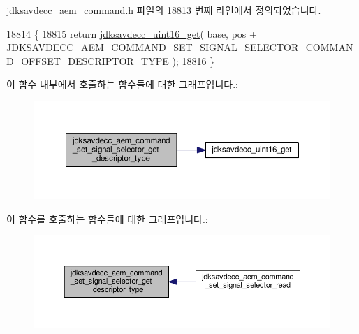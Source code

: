 jdksavdecc\+\_\+aem\+\_\+command.\+h 파일의 18813 번째 라인에서 정의되었습니다.


\begin{DoxyCode}
18814 \{
18815     \textcolor{keywordflow}{return} \hyperlink{group__endian_ga3fbbbc20be954aa61e039872965b0dc9}{jdksavdecc\_uint16\_get}( base, pos + 
      \hyperlink{group__command__set__signal__selector_gaf1c358d17635f50747fe271c5f12a9fe}{JDKSAVDECC\_AEM\_COMMAND\_SET\_SIGNAL\_SELECTOR\_COMMAND\_OFFSET\_DESCRIPTOR\_TYPE}
       );
18816 \}
\end{DoxyCode}


이 함수 내부에서 호출하는 함수들에 대한 그래프입니다.\+:
\nopagebreak
\begin{figure}[H]
\begin{center}
\leavevmode
\includegraphics[width=350pt]{group__command__set__signal__selector_gaee2e81eb3c23ba7973dec680bc8dba95_cgraph}
\end{center}
\end{figure}




이 함수를 호출하는 함수들에 대한 그래프입니다.\+:
\nopagebreak
\begin{figure}[H]
\begin{center}
\leavevmode
\includegraphics[width=350pt]{group__command__set__signal__selector_gaee2e81eb3c23ba7973dec680bc8dba95_icgraph}
\end{center}
\end{figure}


